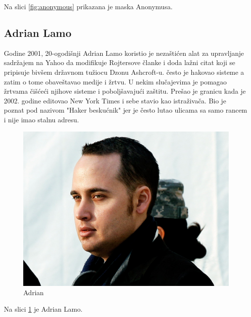 \documentclass[a4paper]{article}
\begin{document}
 Na slici \ref{fig:anonymous} prikazana je maska Anonymusa. 
 
 \subsection{Adrian Lamo}
Godine 2001, 20-ogodišnji Adrian Lamo koristio je nezaštićen alat za upravljanje sadržajem na Yahoo da modifikuje Rojtersove članke i doda lažni citat koji se pripisuje bivšem državnom tužiocu Dzonu Ashcroft-u. često je hakovao sisteme a zatim o tome obaveštavao medije i žrtvu. U nekim slučajevima je pomagao žrtvama čišćeći njihove sisteme i poboljšavajući zaštitu. Prešao je granicu kada je 2002. godine editovao New York Times i sebe stavio kao istraživača. Bio je poznat pod nazivom "Haker beskućnik" jer je često lutao ulicama sa samo rancem i nije imao stalnu adresu.
\begin{figure}[h!]
	\begin{center}
		\includegraphics[scale=0.10]{adrian.jpg}
	\end{center}
	\caption{Adrian}
	\label{fig:adrian}
\end{figure}

Na slici \ref{fig:adrian} je Adrian Lamo.

\newpage
\end{document}

